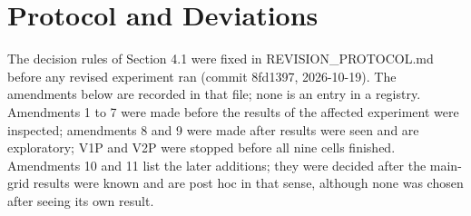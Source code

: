 \documentclass{ieeeaccess}
\begin{document}
\begin{table}[htbp]
\centering
\footnotesize
\caption{Round-level outcomes, variant V1, MPIR seed 1 (an asterisk marks an accepted candidate).}
\end{table}

\section{Protocol and Deviations}

The decision rules of Section 4.1 were fixed in REVISION\_\allowbreak{}PROTOCOL.md before any revised experiment ran (commit 8fd1397, 2026-10-19). The amendments below are recorded in that file; none is an entry in a registry. Amendments 1 to 7 were made before the results of the affected experiment were inspected; amendments 8 and 9 were made after results were seen and are exploratory; V1P and V2P were stopped before all nine cells finished. Amendments 10 and 11 list the later additions; they were decided after the main-grid results were known and are post hoc in that sense, although none was chosen after seeing its own result.
\end{document}
